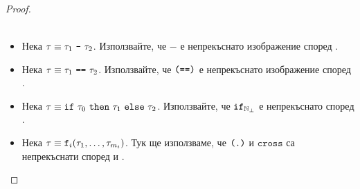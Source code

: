 \begin{proof}
\begin{itemize}
\begin{align*}
    \end{align*}
  \item
    Нека $\tau \equiv \tau_1\ \vv{-}\ \tau_2$.
    Използвайте, че $\minus$ е непрекъснато изображение според .
  \item
    Нека $\tau \equiv \tau_1\ \vv{==}\ \tau_2$.
    Използвайте, че $\texttt{(==)}$ е непрекъснато изображение според .
  \item
    Нека $\tau \equiv \texttt{if}\ \tau_0\ \texttt{then}\ \tau_1\ \texttt{else}\ \tau_2$.
    Използвайте, че $\texttt{if}_{\mathbb{N}_\bot}$ е непрекъснато според .
  \item
    Нека $\tau \equiv \texttt{f}_i(\tau_1,\dots,\tau_{m_i})$.
    Тук ще използваме, че $\texttt{(.)}$ и $\texttt{cross}$ са непрекъснати според  и .


\end{itemize}
\end{proof}
